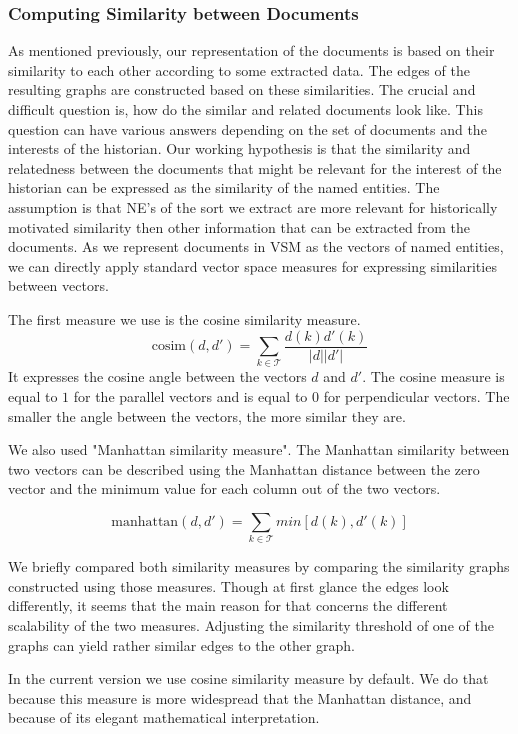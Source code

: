 \subsubsection{Computing Similarity between Documents}\label{sec:computing_similarity_between_documents}

As mentioned previously, our representation of the documents is based on their similarity to each other according to some extracted data. The edges of the resulting graphs are constructed based on these similarities. The crucial and difficult question is, how do the similar and related documents look like. This question can have various answers depending on the set of documents and the interests of the historian. Our working hypothesis is that the similarity and relatedness between the documents that might be relevant for the interest of the historian can be expressed as the similarity of the named entities. 
The assumption is that NE's of the sort we extract are more relevant for historically motivated similarity then other information that can be extracted from the documents. As we represent documents in VSM as the vectors of named entities, we can directly apply standard vector space measures for expressing similarities between vectors. 

The first measure we use is the cosine similarity measure. 
\[\text{cosim}(d,d') = \sum_{k \in \mathcal{T}}\frac{d(k)d'(k)}{|d||d'|}\]
It expresses the cosine angle between the vectors $d$ and $d'$. The cosine measure is equal to $1$ for the parallel vectors and is equal to $0$ for perpendicular vectors. The smaller the angle between the vectors, the more similar they are.

We also used "Manhattan similarity measure". The Manhattan similarity between two vectors can be described using the Manhattan distance between the zero vector and the minimum value for each column out of the two vectors.

\[\text{manhattan}(d,d') = \sum_{k \in \mathcal{T}}min[d(k), d'(k)]\]

We briefly compared both similarity measures by comparing the similarity graphs constructed using those measures. Though at first glance the edges look differently, it seems that the main reason for that concerns the different scalability of the two measures. Adjusting the similarity threshold of one of the graphs can yield rather similar edges to the other graph.

In the current version we use cosine similarity measure by default. We do that because this measure is more widespread that the Manhattan distance, and because of its elegant mathematical interpretation.

